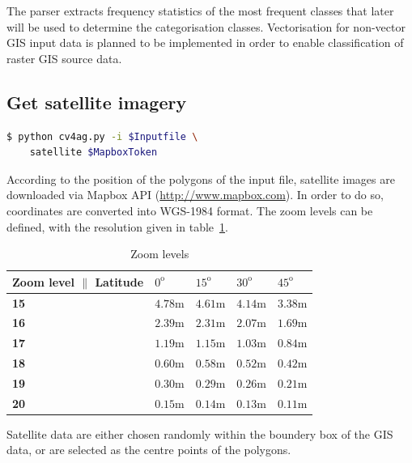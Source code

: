\documentclass[fleqn,10pt]{SelfArx} %
\begin{document}
The parser extracts frequency statistics of the most frequent classes that later will be used to determine the categorisation classes.
Vectorisation for non-vector GIS input data is planned to be implemented in order to enable classification of raster GIS source data.

\subsection{Get satellite imagery}
\begin{lstlisting}[language=bash]
  $ python cv4ag.py -i $Inputfile \
	satellite $MapboxToken
\end{lstlisting}
According to the position of the polygons of the input file, satellite images are downloaded via Mapbox API (\url{http://www.mapbox.com}). In order to do so, coordinates are converted into WGS-1984 format. The zoom levels can be defined, with the resolution given in table~\ref{tab:label}.
\begin{table}[hbt]
\caption{Zoom levels}
\centering
\begin{tabular}{lllll}
\toprule
Zoom level $\|$ Latitude & $0^\mathrm{o}$ & $15^\mathrm{o}$ & $30^\mathrm{o}$ & $45^\mathrm{o}$ \\
\midrule
\textbf{15}&$4.78\mathrm{m}$&$ 4.61\mathrm{m}$&$ 4.14\mathrm{m}$&$ 3.38\mathrm{m}$\\
\textbf{16}&$2.39\mathrm{m}$&$ 2.31\mathrm{m}$&$ 2.07\mathrm{m}$&$ 1.69\mathrm{m}$\\
\textbf{17}&$1.19\mathrm{m}$&$ 1.15\mathrm{m}$&$ 1.03\mathrm{m}$&$ 0.84\mathrm{m}$\\
\textbf{18}&$0.60 \mathrm{m}$&$ 0.58\mathrm{m}$&$0.52\mathrm{m}$&$0.42\mathrm{m}$\\
\textbf{19}&$0.30\mathrm{m}$&$ 0.29\mathrm{m}$&$ 0.26\mathrm{m}$&$ 0.21\mathrm{m}$\\
\textbf{20}&$0.15\mathrm{m}$&$ 0.14\mathrm{m}$&$ 0.13\mathrm{m}$&$ 0.11\mathrm{m}$\\
\bottomrule
\end{tabular}
\label{tab:label}
\end{table}
Satellite data are either chosen randomly within the boundery box of the GIS data, or are selected as the centre points of the polygons. 
\end{document}
